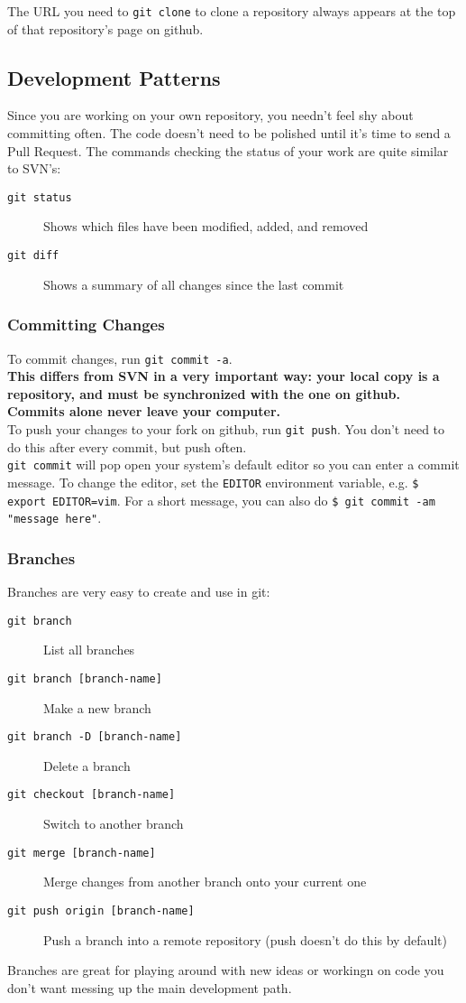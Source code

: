 \documentclass{article}
\begin{document}
The URL you need to {\tt git clone} to clone a repository always appears at the top of that repository's page on github.

\subsection{Development Patterns}
\label{patterns}
Since you are working on your own repository, you needn't feel shy about committing often. The code doesn't need to be polished until it's time to send a Pull Request. The commands checking the status of your work are quite similar to SVN's:
\begin{description}
\item[{\tt git status}] Shows which files have been modified, added, and removed
\item[{\tt git diff}] Shows a summary of all changes since the last commit
\end{description}

\subsubsection{Committing Changes}
To commit changes, run  {\tt git commit -a}.\\

{\bf This differs from SVN in a very important way: your local copy is a repository, and must be synchronized with the one on github. Commits alone never leave your computer.}\\

To push your changes to your fork on github, run {\tt git push}. You don't need to do this after every commit, but push often.\\

{\tt git commit} will pop open your system's default editor so you can enter a commit message. To change the editor, set the {\tt EDITOR} environment variable, e.g. {\tt \$ export EDITOR=vim}. For a short message, you can also do {\tt \$ git commit -am "message here"}.

\subsubsection{Branches}
Branches are very easy to create and use in git:
\begin{description}
\item[{\tt git branch}] List all branches
\item[{\tt git branch [branch-name]}] Make a new branch
\item[{\tt git branch -D [branch-name]}] Delete a branch
\item[{\tt git checkout [branch-name]}] Switch to another branch
\item[{\tt git merge [branch-name]}] Merge changes from another branch onto your current one
\item[{\tt git push origin [branch-name]}] Push a branch into a remote repository (push doesn't do this by default)
\end{description}
Branches are great for playing around with new ideas or workingn on code you don't want messing up the main development path.
\end{document}
